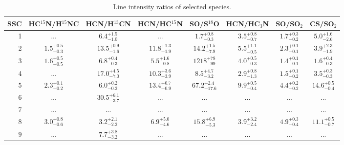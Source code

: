 \begin{table}[ph]
    \centering
    \footnotesize
    \begin{threeparttable}
        \caption[Line intensity ratios of selected species]{Line intensity ratios of selected species.
        \label{SSCs: table: ratios other}}
        
        \begin{tabular}{r|ccccccc}
            \toprule
            SSC & HC$^{15}$N/H$^{15}$NC & HCN/H$^{13}$CN & HCN/HC$^{15}$N & SO/S$^{18}$O & HCN/HC$_3$N & SO/SO$_2$ & CS/SO$_2$ \\
            \midrule
 1 &                    ... & $ 6.4^{+ 1.5}_{- 1.0}$ &                    ... & $ 1.7^{+ 0.8}_{- 0.3}$ & $ 3.5^{+ 0.8}_{- 0.7}$ & $ 1.7^{+ 0.3}_{- 0.2}$ & $ 5.0^{+ 1.6}_{- 2.6}$\\
 2 & $ 1.5^{+ 0.5}_{- 0.3}$ & $13.5^{+ 0.9}_{- 1.6}$ & $11.8^{+ 1.3}_{- 1.9}$ & $14.2^{+ 1.5}_{- 7.9}$ & $ 5.5^{+ 1.1}_{- 0.5}$ & $ 2.3^{+ 0.1}_{- 0.1}$ & $ 3.9^{+ 2.3}_{- 1.9}$\\
 3 & $ 1.6^{+ 0.5}_{- 0.5}$ & $ 6.8^{+ 0.4}_{- 0.3}$ & $ 5.5^{+ 1.6}_{- 0.8}$ & $1218^{+  78}_{-  99}$ & $ 4.0^{+ 0.5}_{- 0.3}$ & $ 1.4^{+ 0.1}_{- 0.1}$ & $ 1.6^{+ 0.4}_{- 0.3}$\\
 4 &                    ... & $17.0^{+ 4.5}_{- 7.0}$ & $10.3^{+ 3.6}_{- 3.9}$ & $ 8.5^{+ 4.7}_{- 3.2}$ & $ 2.9^{+ 0.8}_{- 1.3}$ & $ 1.5^{+ 0.1}_{- 0.2}$ & $ 3.5^{+ 0.3}_{- 0.3}$\\
 5 & $ 2.3^{+ 0.1}_{- 0.2}$ & $ 6.0^{+ 0.2}_{- 0.2}$ & $13.4^{+ 0.7}_{- 0.9}$ & $67.2^{+ 2.4}_{-17.6}$ & $ 9.9^{+ 0.5}_{- 0.4}$ & $ 4.4^{+ 0.2}_{- 0.2}$ & $14.6^{+ 0.5}_{- 0.4}$\\
 6 &                    ... & $30.5^{+ 6.1}_{- 3.7}$ &                    ... &                    ... &                    ... &                    ... &                    ...\\
 7 &                    ... &                    ... &                    ... &                    ... &                    ... &                    ... &                    ...\\
 8 & $ 3.0^{+ 0.8}_{- 0.6}$ & $ 3.2^{+ 2.1}_{- 2.2}$ & $ 6.9^{+ 5.0}_{- 4.6}$ & $15.8^{+ 6.9}_{- 5.3}$ & $ 3.9^{+ 3.2}_{- 2.4}$ & $ 4.9^{+ 0.3}_{- 0.4}$ & $11.1^{+ 0.5}_{- 0.7}$\\
 9 &                    ... & $ 7.7^{+ 3.8}_{- 3.2}$ &                    ... &                    ... &                    ... &                    ... &                    ...\\

\end{tabular}
\end{threeparttable}
\end{table}
